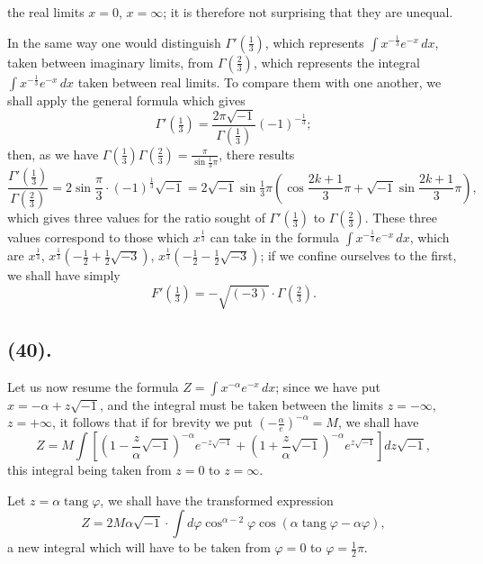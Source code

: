 \documentclass{article}
\begin{document}
the real limits $x=0$, $x=\infty$; it is therefore not surprising that they are unequal.

In the same way one would distinguish $\Gamma'\left(\frac{1}{3}\right)$, which represents $\displaystyle\int x^{-\frac{1}{3}}e^{-x}\,dx$, taken between imaginary limits, from $\Gamma\left(\frac{2}{3}\right)$, which represents the integral $\displaystyle\int x^{-\frac{1}{3}}e^{-x}\,dx$ taken between real limits. To compare them with one another, we shall apply the general formula which gives
\[ \Gamma'\left(\tfrac{1}{3}\right)=\frac{2\pi\sqrt{-1}}{\Gamma\left(\frac{1}{3}\right)}(-1)^{-\frac{1}{3}}; \]
then, as we have $\Gamma\left(\frac{1}{3}\right)\Gamma\left(\frac{2}{3}\right)=\frac{\pi}{\sin\frac{1}{3}\pi}$, there results
\[ \frac{\Gamma'\left(\frac{1}{3}\right)}{\Gamma\left(\frac{2}{3}\right)}=2\sin\frac{\pi}{3}\cdot(-1)^{\frac{1}{3}}\sqrt{-1}=2\sqrt{-1}\sin\tfrac{1}{3}\pi\left(\cos\frac{2k+1}{3}\pi+\sqrt{-1}\sin\frac{2k+1}{3}\pi\right), \]
which gives three values for the ratio sought of $\Gamma'\left(\frac{1}{3}\right)$ to $\Gamma\left(\frac{2}{3}\right)$. These three values correspond to those which $x^{\frac{1}{3}}$ can take in the formula $\displaystyle\int x^{-\frac{1}{3}}e^{-x}\,dx$, which are $x^{\frac{1}{3}}$, $x^{\frac{1}{3}}\left(-\frac{1}{2}+\frac{1}{2}\sqrt{-3}\right)$, $x^{\frac{1}{3}}\left(-\frac{1}{2}-\frac{1}{2}\sqrt{-3}\right)$; if we confine ourselves to the first, we shall have simply
\[ F'\left(\tfrac{1}{3}\right)=-\sqrt{(-3)}\cdot\Gamma\left(\tfrac{2}{3}\right). \]

\subsection*{(40).}

Let us now resume the formula $Z=\displaystyle\int x^{-\alpha}e^{-x}\,dx$; since we have put $x=-\alpha+z\sqrt{-1}$, and the integral must be taken between the limits $z=-\infty$, $z=+\infty$, it follows that if for brevity we put $\left(-\frac{\alpha}{e}\right)^{-\alpha}=M$, we shall have
\[ Z=M\int\left[\left(1-\frac{z}{\alpha}\sqrt{-1}\right)^{-\alpha}e^{-z\sqrt{-1}}+\left(1+\frac{z}{\alpha}\sqrt{-1}\right)^{-\alpha}e^{z\sqrt{-1}}\right]dz\sqrt{-1}, \]
this integral being taken from $z=0$ to $z=\infty$.

Let $z=\alpha\operatorname{tang}\varphi$, we shall have the transformed expression
\[ Z=2M\alpha\sqrt{-1}\cdot\int d\varphi\cos^{\alpha-2}\varphi\cos(\alpha\operatorname{tang}\varphi-\alpha\varphi), \]
a new integral which will have to be taken from $\varphi=0$ to $\varphi=\frac{1}{2}\pi$.
\end{document}
